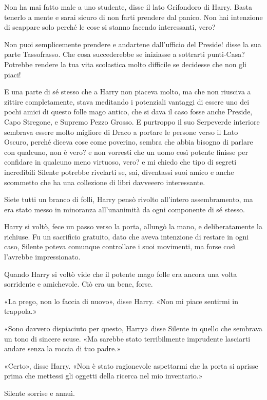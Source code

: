 Non ha mai fatto male a uno studente, disse il lato Grifondoro di Harry. Basta tenerlo a mente e sarai sicuro di non farti prendere dal panico. Non hai intenzione di scappare solo perché le cose si stanno facendo interessanti, vero?

Non puoi semplicemente prendere e andartene dall’ufficio del Preside! disse la sua parte Tassofrasso. Che cosa succederebbe se iniziasse a sottrarti punti-Casa? Potrebbe rendere la tua vita scolastica molto difficile se decidesse che non gli piaci!

E una parte di sé stesso che a Harry non piaceva molto, ma che non riusciva a zittire completamente, stava meditando i potenziali vantaggi di essere uno dei pochi amici di questo folle mago antico, che si dava il caso fosse anche Preside, Capo Stregone, e Supremo Pezzo Grosso. E purtroppo il suo Serpeverde interiore sembrava essere molto migliore di Draco a portare le persone verso il Lato Oscuro, perché diceva cose come poverino, sembra che abbia bisogno di parlare con qualcuno, non è vero? e non vorresti che un uomo così potente finisse per confidare in qualcuno meno virtuoso, vero? e mi chiedo che tipo di segreti incredibili Silente potrebbe rivelarti se, sai, diventassi suoi amico e anche scommetto che ha una collezione di libri davveeero interessante.

Siete tutti un branco di folli, Harry pensò rivolto all’intero assembramento, ma era stato messo in minoranza all’unanimità da ogni componente di sé stesso.

Harry si voltò, fece un passo verso la porta, allungò la mano, e deliberatamente la richiuse. Fu un sacrificio gratuito, dato che aveva intenzione di restare in ogni caso, Silente poteva comunque controllare i suoi movimenti, ma forse così l’avrebbe impressionato.

Quando Harry si voltò vide che il potente mago folle era ancora una volta sorridente e amichevole. Ciò era un bene, forse.

«La prego, non lo faccia di nuovo», disse Harry. «Non mi piace sentirmi in trappola.»

«Sono davvero dispiaciuto per questo, Harry» disse Silente in quello che sembrava un tono di sincere scuse. «Ma sarebbe stato terribilmente imprudente lasciarti andare senza la roccia di tuo padre.»

«Certo», disse Harry. «Non è stato ragionevole aspettarmi che la porta si aprisse prima che mettessi gli oggetti della ricerca nel mio inventario.»

Silente sorrise e annuì.

